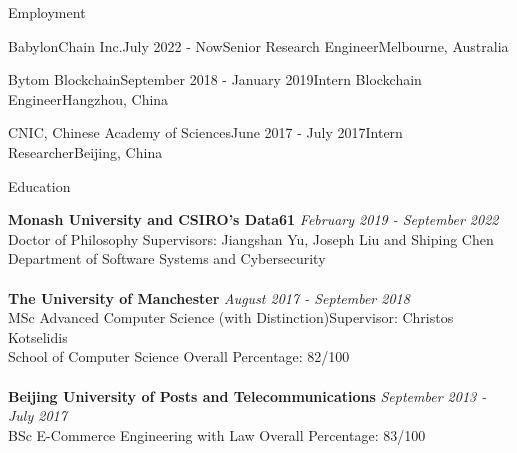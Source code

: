 \documentclass{resume} %
\begin{document}
\begin{rSection}{Employment}
    \begin{rSubsubsection}{BabylonChain Inc.}{July 2022 - Now}{Senior Research Engineer}{Melbourne, Australia}
    \end{rSubsubsection}

    \begin{rSubsubsection}{Bytom Blockchain}{September 2018 - January 2019}{Intern Blockchain Engineer}{Hangzhou, China}
    \end{rSubsubsection}

    \begin{rSubsubsection}{CNIC, Chinese Academy of Sciences}{June 2017 - July 2017}{Intern Researcher}{Beijing, China}
    \end{rSubsubsection}
\end{rSection}

\begin{rSection}{Education}

    {\bf Monash University and CSIRO's Data61} \hfill {\em February 2019 - September 2022}
    \\ Doctor of Philosophy\hfill { Supervisors: Jiangshan Yu, Joseph Liu and Shiping Chen}
    \\ Department of Software Systems and Cybersecurity\\
    \\{\bf The University of Manchester} \hfill {\em August 2017 - September 2018}
    \\ MSc Advanced Computer Science (with Distinction)\hfill {Supervisor: Christos Kotselidis}
    \\ School of Computer Science\hfill { Overall Percentage: 82/100 }\\
    \\{\bf Beijing University of Posts and Telecommunications} \hfill {\em September 2013 - July 2017}
    \\ BSc E-Commerce Engineering with Law\hfill { Overall Percentage: 83/100 }

\end{rSection}

\end{document}
